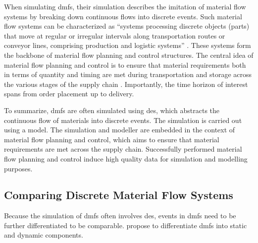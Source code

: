 When simulating \gls{dmfs}, their simulation describes the imitation of material flow systems by breaking down continuous flows into discrete events. Such material flow systems can be characterized as ``systems processing discrete objects (parts) that move at regular or irregular intervals along transportation routes or conveyor lines, comprising production and logistic systems” \autocite{Arnold2006,Schwede2024}. These systems form the backbone of material flow planning and control structures. The central idea of material flow planning and control is to ensure that material requirements \textemdash both in terms of quantity and timing \textemdash are met during transportation and storage across the various stages of the supply chain \autocite{Gehr2007}. Importantly, the time horizon of interest spans from order placement up to delivery.

To summarize, \gls{dmfs} are often simulated using \gls{des}, which abstracts the continuous flow of materials into discrete events. The simulation is carried out using a model. The simulation and modeller are embedded in the context of material flow planning and control, which aims to ensure that material requirements are met across the supply chain. Successfully performed material flow planning and control induce high quality data for simulation and modelling purposes.

\subsection{Comparing Discrete Material Flow Systems}
\label{sec:comparing-dmfs}
Because the simulation of \gls{dmfs} often involves \gls{des}, events in \gls{dmfs} need to be further differentiated to be comparable. \Textcite{Arnold2006} propose to differentiate \gls{dmfs} into static and dynamic components.

